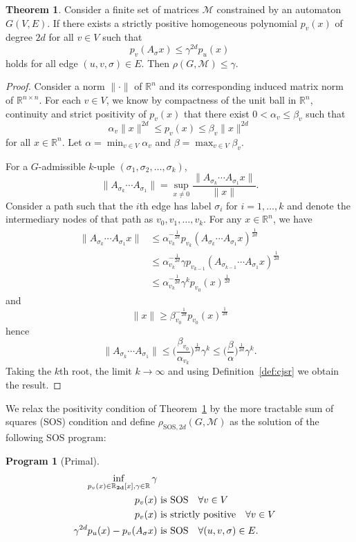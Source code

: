 \documentclass{sig-alternate-05-2015}
\newcommand{\1}{\mathbf{1}}
\newcommand{\Rh}{\R_{\mathbf{2d}}}
\theoremstyle{definition}
\newtheorem{mytheo}{Theorem}
\newtheorem{myprog}{Program}
\newcommand{\R}{\mathbb{R}}
\newcommand{\Rn}{\R^n}
\newcommand{\A}{\mathcal{M}}
\newcommand{\G}{G}
\newcommand{\jsrsos}[1][2d]{\rho_{\mathrm{SOS},#1}(\G,\A)}
\newcommand{\cjsr}{\rho(\G,\A)}
\newcommand{\Nodes}{V}
\newcommand{\Arcs}{E}
\newcommand{\arc}{edge}
\newcommand{\defAGe  }{a finite set of matrices $\A$ constrained by an automaton $\G(\Nodes,\Arcs)$}
\begin{document}
\begin{mytheo}
  \label{theo:pos}
  Consider \defAGe{}.
  If there exists a strictly positive homogeneous polynomial $p_v(x)$ of degree $2d$ for all $v \in \Nodes$
  such that
  \[ p_{v}(A_\sigma x) \leq \gamma^{2d}p_{u}(x) \]
  holds for all \arc{} $(u,v,\sigma) \in \Arcs$.
  Then $\cjsr \leq \gamma$.
  \begin{proof}
    Consider a norm $\|\cdot\|$ of $\Rn$ and its corresponding induced matrix norm of $\R^{n \times n}$.
    For each $v \in \Nodes$, we know by compactness of the unit ball in $\Rn$, continuity and strict positivity of $p_v(x)$ that there exist $0 < \alpha_v \leq \beta_v$ such that
    \[ \alpha_v \|x\|^{2d} \leq p_v(x) \leq \beta_v\|x\|^{2d} \]
    for all $x \in \Rn$.
    Let $\alpha = \min_{v \in \Nodes} \alpha_v$ and $\beta = \max_{v \in \Nodes} \beta_v$.

    For a $\G$-admissible $k$-uple $(\sigma_1, \sigma_2, \ldots, \sigma_k)$,
    \[ \|A_{\sigma_k} \cdots A_{\sigma_1}\| = \sup_{x \neq 0} \frac{\|A_{\sigma_k} \cdots A_{\sigma_1}x\|}{\|x\|}. \]
    Consider a path such that the $i$th edge has label $\sigma_i$ for $i = 1, \ldots, k$
    and denote the intermediary nodes of that path as $v_0, v_1, \ldots, v_k$.
    For any $x \in \Rn$, we have
    \begin{align*}
      \|A_{\sigma_k} \cdots A_{\sigma_1}x\| & \leq \alpha_{v_k}^{-\frac{1}{2d}} p_{v_k}(A_{\sigma_k} \cdots A_{\sigma_1} x)^{\frac{1}{2d}}\\
                                            & \leq \alpha_{v_k}^{-\frac{1}{2d}} \gamma p_{v_{k-1}}(A_{\sigma_{k-1}} \cdots A_{\sigma_1} x)^{\frac{1}{2d}}\\
                                            & \leq \alpha_{v_k}^{-\frac{1}{2d}} \gamma^{k} p_{v_0}(x)^{\frac{1}{2d}}
    \end{align*}
    and
    \[ \|x\| \geq \beta_{v_0}^{-\frac{1}{2d}} p_{v_0}(x)^{\frac{1}{2d}} \]
    hence
    \[ \|A_{\sigma_k} \cdots A_{\sigma_1}\| \leq \Big(\frac{\beta_{v_0}}{\alpha_{v_k}}\Big)^{\frac{1}{2d}} \gamma^k \leq \Big(\frac{\beta}{\alpha}\Big)^{\frac{1}{2d}} \gamma^k. \]
    Taking the $k$th root, the limit $k \to \infty$ and using Definition~\ref{def:cjsr} we obtain the result.
  \end{proof}
\end{mytheo}

We relax the positivity condition of Theorem~\ref{theo:pos} by the more tractable sum of squares (SOS) condition and
define $\jsrsos$ as the solution of the following SOS program:
\begin{myprog}[Primal]
  \label{prog:primal}
  \begin{align}
    \notag
    \inf_{p_v(x) \in \Rh[x],\gamma \in \R} \gamma\\
    \label{eq:soscons1}
    p_v(x) & \text{ is SOS} \quad \forall v \in \Nodes\\
    \label{eq:soscons3}
    p_v(x) & \text{ is strictly positive} \quad \forall v \in \Nodes\\
    \notag
    \gamma^{2d} p_u(x) - p_v(A_\sigma x) & \text{ is SOS} \quad \forall (u, v, \sigma) \in \Arcs.
  \end{align}
\end{myprog}
\end{document}
